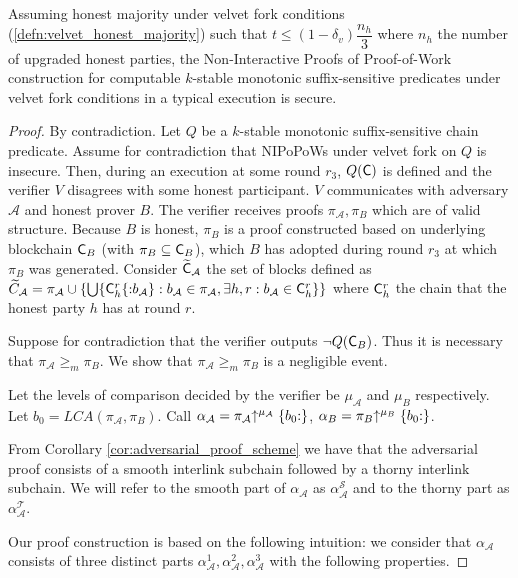 \begin{theorem}
	Assuming honest majority under velvet fork conditions (\ref{defn:velvet_honest_majority}) such that $t \leq (1 - \delta_v) \dfrac{n_h}{3}$ where $n_h$ the number of upgraded honest parties, the Non-Interactive Proofs of Proof-of-Work construction for computable $k$-stable monotonic suffix-sensitive predicates under velvet fork conditions in a typical execution is secure.
\end{theorem}
\begin{proof}
By contradiction. Let $Q$ be a $k$-stable monotonic suffix-sensitive chain predicate. Assume for contradiction that NIPoPoWs under velvet fork on $Q$ is insecure. Then, during an execution at some round  $r_3$, $Q(\mathsf{C})$ is defined and the verifier $V$ disagrees with some honest participant. $V$ communicates with adversary $\mathcal{A}$ and honest prover $B$. The verifier receives proofs $\pi_\mathcal{A}, \pi_B$ which are of valid structure. Because $B$ is honest, $\pi_B$ is a proof constructed based on underlying blockchain $\mathsf{C}_B$ (with $\pi_B \subseteq \mathsf{C}_B$), which $B$ has adopted during round $r_3$ at which $\pi_B$ was generated. Consider $\widetilde{\mathsf{C}}_\mathcal{A}$ the set of blocks defined as $\widetilde{C}_\mathcal{A} = \pi_\mathcal{A} \cup \{ \bigcup \{\mathsf{C}_h^r\{{:}b_\mathcal{A}\}:  b_\mathcal{A} \in \pi_\mathcal{A}, \exists h,r : b_\mathcal{A} \in \mathsf{C}_{h}^{r}\}  \}$ where $\mathsf{C}_h^r$ the chain that the honest party $h$ has at round $r$.

Suppose for contradiction that the verifier outputs $\neg Q(\mathsf{C}_B)$. Thus it is necessary that $\pi_\mathcal{A} {\geq}_m \pi_B$. We show that $\pi_\mathcal{A} {\geq}_m \pi_B$ is a negligible event.

Let the levels of comparison decided by the verifier be $\mu_\mathcal{A}$ and $\mu_B$ respectively. Let $b_0 = LCA(\pi_\mathcal{A}, \pi_B)$. Call $\alpha_\mathcal{A} = \pi_\mathcal{A} \negthickspace\uparrow^{\mu_\mathcal{A}}\{b_0{:}\}$, $\alpha_B = \pi_B \negthickspace\uparrow^{\mu_B}\{b_0{:}\}$.

From Corollary \ref{cor:adversarial_proof_scheme} we have that the adversarial proof consists of a smooth interlink subchain followed by a thorny interlink subchain. We will refer to the smooth part of $\alpha_\mathcal{A}$ as $\alpha^{\mathcal{S}}_\mathcal{A}$ and to the thorny part as $\alpha^{\mathcal{T}}_\mathcal{A}$.

Our proof construction is based on the following intuition: we consider that $\alpha_\mathcal{A}$ consists of three distinct parts $\alpha_\mathcal{A}^1, \alpha_\mathcal{A}^2, \alpha_\mathcal{A}^3$ with the following properties.


\end{proof}
